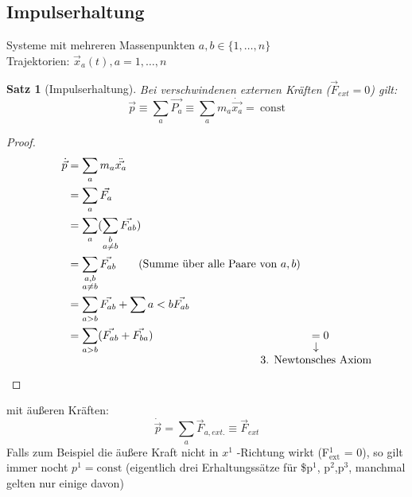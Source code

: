 \documentclass[a4paper]{scrartcl}
\renewcommand{\v}[1]{\vec{#1}}
\theoremstyle{definition}
\theoremstyle{plain}
\newtheorem{thm}{Satz}
\theoremstyle{remark}
\theoremstyle{remark}
\begin{document}
\subsection{Impulserhaltung}
\label{sec-4-1}
Systeme mit mehreren Massenpunkten $a,b\in\{1,\ldots, n\}$ \\
   Trajektorien: $\v x_a(t), a=1,\ldots,n$ \\
\begin{thm}[Impulserhaltung]
Bei verschwindenen externen Kräften ($\v F_{ext} = 0$) gilt:
\[\v p \equiv \sum_a \v{P_a} \equiv \sum_a m_a\dot{\v{x_a}} =~\text{const}\]
\end{thm}
\begin{proof}
\begin{align*}
\dot{\v p} &= \sum_a m_a \ddot{\v{x_a}} \\
&= \sum_a \v{F_a} \\
&= \sum_a(\sum_{\substack{b \\ a\neq b}} \v{F_{ab}}) \\
&= \sum_{\substack{a,b \\ a\neq b}} \v{F_{ab}} \tag{Summe über alle Paare von $a,b$} \\
&= \sum_{a > b}\v{F_{ab}} + \sum{a < b} \v{F_{ab}} \\
&= \sum_{a > b}(\v{F_{ab}} + \v{F_{ba}})
&\underarrow[=]{3. Newtonsches Axiom} 0 \tag*{\qedhere}
\end{align*}
\end{proof}

mit äußeren Kräften:
\[\dot{\v p} = \sum_a \v F_{a,ext.} \equiv \v F_{ext}\]
Falls zum Beispiel die äußere Kraft nicht in $x^1$ -Richtung wirkt (F$^{\text{1}}_{\text{ext}}$ = 0), so gilt immer nocht $p^1 = \text{const}$
(eigentlich drei Erhaltungssätze für \$p$^{\text{1}}$, p$^{\text{2}}$,p$^{\text{3}}$, manchmal gelten nur einige davon)
\end{document}

